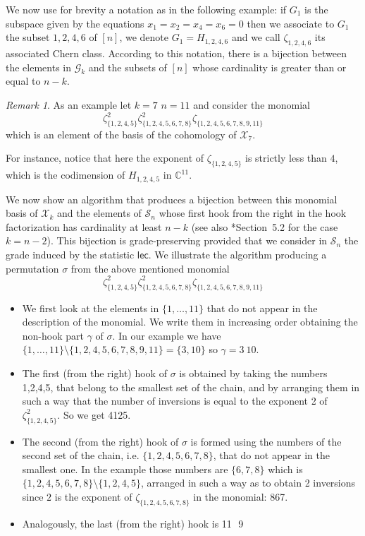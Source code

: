 \documentclass[a4paper]{amsart}
\newcommand{\lec}{\mathsf{lec}}
\newcommand{\cX}{\mathcal X}
\theoremstyle{definition}
\theoremstyle{remark}
\newtheorem{remark}[theorem]{Remark}
\numberwithin{equation}{section}
\begin{document}
We now use  for brevity a notation as in the following example: if \(G_1\) is the subspace given by the equations \(x_1=x_2=x_4=x_6=0\) then we associate to \(G_1\) the subset \({1,2,4,6}\) of \([n]\), we denote  \(G_1=H_{1,2,4,6}\)  and we call \(\zeta_{1,2,4,6}\) its associated Chern class. According to this notation,  there is a bijection between the elements in \(\mathcal G_k\) and the subsets of \([n]\) whose  cardinality is greater than or equal to  \(n-k\).
\begin{remark}
As an example let \(k=7\) $n=11$ and consider the monomial
\begin{equation}
\label{esempiobase}
\zeta_{\{1,2,4,5\}}^2\zeta_{\{1,2,4,5,6,7,8\}}^2\zeta_{\{1,2,4,5,6,7,8,9,11\}}
\end{equation}  
which is an element of the basis of the cohomology of \(\cX_{7} \).

For instance, notice that here  the exponent of $\zeta_{\{1,2,4,5\}}$ is strictly less than $4$, which is  the codimension of $H_{1,2,4,5}$ in $\mathbb C^{11}$. 
%
\end{remark}
We now show an algorithm that produces a bijection between this monomial  basis of $\cX_{k}$ and the elements of \(\mathcal{S}_n\) whose first hook from the right in the hook factorization has cardinality at least \(n-k\) (see also \cite{GPS24}*{Section~5.2} for the case $k=n-2$). This bijection is grade-preserving provided that we consider in \(\mathcal{S}_n\) the grade induced by the statistic $\lec$.
We illustrate the algorithm producing a permutation \(\sigma\) from the above mentioned monomial 
\[
\zeta_{\{1,2,4,5\}}^2\zeta_{\{1,2,4,5,6,7,8\}}^2\zeta_{\{1,2,4,5,6,7,8,9,11\}}
\] 
\begin{itemize}
\item We first look at the elements in $\{1,\ldots,11\}$ that do not appear in the description of the monomial. We write them in increasing order obtaining the non-hook part $\gamma$ of $\sigma$. In our example we have $\{1,\dotsc,11\}\setminus \{1,2,4,5,6,7,8,9,11\}=\{3,10\}$ so $\gamma=3\  10$.
\item The first (from the right) hook  of $\sigma$ is obtained by taking  the numbers 1,2,4,5, that belong to the smallest set of the chain, and by arranging them in such a way that the number of inversions is equal to the exponent 2 of \(\zeta_{\{1,2,4,5\}}^2\). So we get 4125.
\item The second (from the right) hook  of $\sigma$ is formed using the numbers of the second set of the chain, i.e. \(\{1,2,4,5,6,7,8\}\), that do not appear in the smallest one. In the example those numbers are $\{6,7,8\}$ which is $\{1,2,4,5,6,7,8\}\setminus \{1,2,4,5\}$, arranged in such a way as to obtain 2 inversions since $2$ is the exponent of $\zeta_{\{1,2,4,5,6,7,8\}}$ in the monomial: 867.
\item Analogously, the last (from the right) hook  is 11 \( \) 9
\end{itemize}
\end{document}
